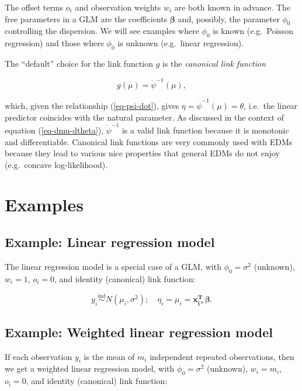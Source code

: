 \documentclass[
  11pt,
  letterpaper,
  oneside]{book}
\theoremstyle{definition}
\theoremstyle{plain}
\theoremstyle{plain}
\theoremstyle{plain}
\theoremstyle{remark}
\begin{document}
The offset terms \(o_i\) and observation weights \(w_i\) are both known
in advance. The free parameters in a GLM are the coefficients
\(\boldsymbol{\beta}\) and, possibly, the parameter \(\phi_0\)
controlling the dispersion. We will see examples where \(\phi_0\) is
known (e.g.~Poisson regression) and those where \(\phi_0\) is unknown
(e.g.~linear regression).

The ``default'' choice for the link function \(g\) is the
\emph{canonical link function}

\[
g(\mu) = \dot \psi^{-1}(\mu),
\]

which, given the relationship (\ref{eq-psi-dot}), gives
\(\eta = \dot \psi^{-1}(\mu) = \theta\), i.e.~the linear predictor
coincides with the natural parameter. As discussed in the context of
equation (\ref{eq-dmu-dtheta}), \(\dot \psi^{-1}\) is a valid link
function because it is monotonic and differentiable. Canonical link
functions are very commonly used with EDMs because they lead to various
nice properties that general EDMs do not enjoy (e.g.~concave
log-likelihood).

\hypertarget{examples-1}{%
\section{Examples}\label{examples-1}}

\hypertarget{example-linear-regression-model}{%
\subsection{Example: Linear regression
model}\label{example-linear-regression-model}}

The linear regression model is a special case of a GLM, with
\(\phi_0 = \sigma^2\) (unknown), \(w_i = 1\), \(o_i = 0\), and identity
(canonical) link function:

\[
y_i \overset{\text{ind}}\sim N(\mu_i, \sigma^2); \quad \eta_i = \mu_i = \boldsymbol{x_{i*}^T} \boldsymbol{\beta}.
\]

\hypertarget{example-weighted-linear-regression-model}{%
\subsection{Example: Weighted linear regression
model}\label{example-weighted-linear-regression-model}}

If each observation \(y_i\) is the mean of \(m_i\) independent repeated
observations, then we get a weighted linear regression model, with
\(\phi_0 = \sigma^2\) (unknown), \(w_i = m_i\), \(o_i = 0\), and
identity (canonical) link function:
\end{document}
